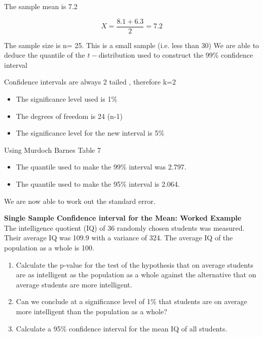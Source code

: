 The sample mean is 7.2

\[X=\frac{8.1 + 6.3}{2}=7.2\]

The sample size is n= 25. This is a small sample (i.e. less than 30)
We are able to deduce the quantile of the $t-$distribution used to construct the 99\% confidence interval

Confidence intervals are always 2 tailed , therefore k=2
\begin{itemize}
\item The significance level used is 1\%
\item The degrees of freedom  is 24 (n-1)
\item The significance level for the new interval is 5\%
\end{itemize}
Using Murdoch Barnes Table 7
\begin{itemize}
\item The quantile used to make the 99\% interval was 2.797.
\item The quantile used to make the 95\% interval is 2.064.
\end{itemize}
We are now able to work out the standard error.


\item \textbf{Single Sample Confidence interval for the Mean: Worked Example}\\

The intelligence quotient (IQ) of 36 randomly chosen students was measured.
Their average IQ was 109.9 with a variance of 324.
The average IQ of the population as a whole is 100.

\begin{enumerate}
\item Calculate the p-value for the test of the hypothesis that on average
students are as intelligent as the population as a whole against the alternative that on average students are more intelligent.


\item Can we conclude at a significance level of 1\% that students are on average more intelligent than the population as a whole?

\item Calculate a 95\% confidence interval for the mean IQ of all students.

\end{enumerate}

